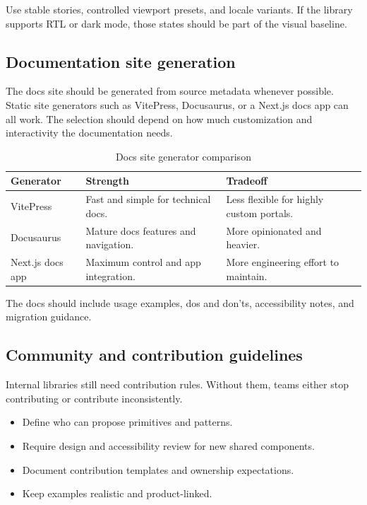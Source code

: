 Use stable stories, controlled viewport presets, and locale variants. If the library supports RTL or dark mode, those states should be part of the visual baseline.

\subsection{Documentation site generation}
The docs site should be generated from source metadata whenever possible. Static site generators such as VitePress, Docusaurus, or a Next.js docs app can all work. The selection should depend on how much customization and interactivity the documentation needs.

\begin{table}[htbp]
  \centering
  \caption{Docs site generator comparison}
  \begin{tabularx}{\textwidth}{@{}p{}p{}Y@{}}
    \toprule
    \textbf{Generator} & \textbf{Strength} & \textbf{Tradeoff} \\
    \midrule
    VitePress & Fast and simple for technical docs. & Less flexible for highly custom portals. \\
    Docusaurus & Mature docs features and navigation. & More opinionated and heavier. \\
    Next.js docs app & Maximum control and app integration. & More engineering effort to maintain. \\
    \bottomrule
  \end{tabularx}
\end{table}

The docs should include usage examples, dos and don'ts, accessibility notes, and migration guidance.

\subsection{Community and contribution guidelines}
Internal libraries still need contribution rules. Without them, teams either stop contributing or contribute inconsistently.

\begin{itemize}[leftmargin=*, itemsep=0.35em]
  \item Define who can propose primitives and patterns.
  \item Require design and accessibility review for new shared components.
  \item Document contribution templates and ownership expectations.
  \item Keep examples realistic and product-linked.
\end{itemize}

